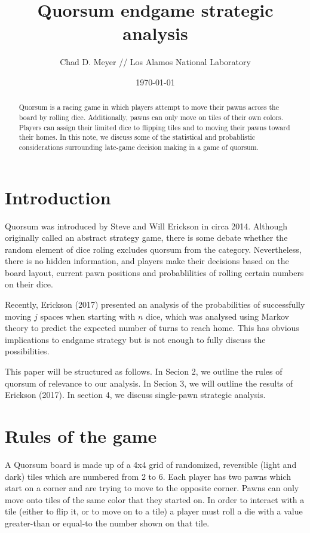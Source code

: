\documentclass[letterpaper]{article}
\begin{document}
\title{Quorsum endgame strategic analysis}
\author{Chad D. Meyer // Los Alamos National Laboratory}
\date{\today}
\maketitle

\begin{abstract}
Quorsum is a racing game in which players attempt to move their pawns across
the board by rolling dice.  Additionally, pawns can only move on tiles of
their own colors.  Players can assign their limited dice to flipping tiles
and to moving their pawns toward their homes.  In this note, we discuss some
of the statistical and probablistic considerations surrounding late-game
decision making in a game of quorsum.
\end{abstract}

\section{Introduction}
Quorsum was introduced by Steve and Will Erickson in circa 2014.  Although
originally called an abstract strategy game, there is some debate whether the
random element of dice roling excludes quorsum from the category.  Nevertheless,
there is no hidden information, and players make their decisions based on the
board layout, current pawn positions and probablilities of rolling certain
numbers on their dice.

Recently, Erickson (2017) presented an analysis of the probabilities of
successfully moving $j$ spaces when starting with $n$ dice, which was analysed
using Markov theory to predict the expected number of turns to reach home.  This
has obvious implications to endgame strategy but is not enough to fully discuss
the possibilities.

This paper will be structured as follows.  In Secion 2, we outline the rules of
quorsum of relevance to our analysis.  In Secion 3, we will outline the results
of Erickson (2017).  In section 4, we discuss single-pawn strategic analysis.

\section{Rules of the game}
A Quorsum board is made up of a 4x4 grid of randomized, reversible (light and
dark) tiles which are numbered from 2 to 6.  Each player has two pawns which
start on a corner and are trying to move to the opposite corner.  Pawns can only
move onto tiles of the same color that they started on.  In order to
interact with a tile (either to flip it, or to move on to a tile) a player must
roll a die with a value greater-than or equal-to the number shown on that tile.
\end{document}
